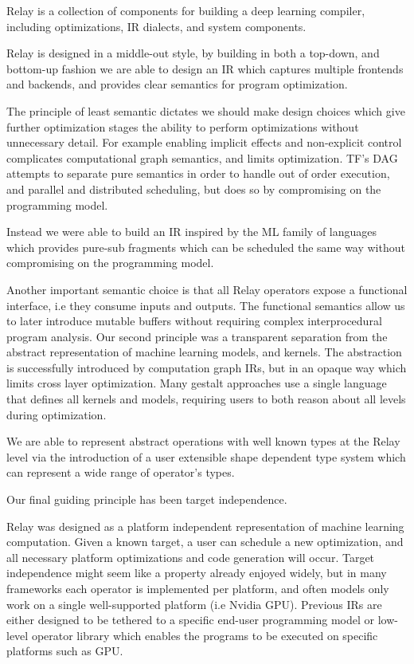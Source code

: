 Relay is a collection of components for building a deep learning compiler,
  including optimizations, IR dialects, and system components.

Relay is designed in a middle-out style,
  by building in both a top-down,
  and bottom-up fashion we are able to design an IR which captures multiple frontends and backends,
  and provides clear semantics for program optimization.

The principle of least semantic dictates we should make design choices which give further optimization stages
  the ability to perform optimizations without unnecessary detail.
For example enabling implicit effects and non-explicit control complicates computational graph semantics,
  and limits optimization.
TF’s DAG attempts to separate pure semantics in order to handle out of order execution, and parallel and distributed scheduling,
  but does so by compromising on the programming model.

Instead we were able to build an IR inspired by the ML family of languages which provides pure-sub fragments which can be scheduled
  the same way without compromising on the programming model.

Another important semantic choice is that all Relay operators expose a functional interface, i.e they consume inputs and outputs.
The functional semantics allow us to later introduce mutable buffers without requiring complex interprocedural program analysis.
Our second principle was a transparent separation from the abstract representation of machine learning models, and kernels.
The abstraction is successfully introduced by computation graph IRs, but in an opaque way which limits cross layer optimization.
Many gestalt approaches use a single language that defines all kernels and models, requiring users to both reason about all levels during optimization.

We are able to represent abstract operations with well known types at the Relay level via the introduction of a user extensible shape dependent
  type system which can represent a wide range of operator’s types.

Our final guiding principle has been target independence.

Relay was designed as a platform independent representation of machine learning computation.
Given a known target, a user can schedule a new optimization,
  and all necessary platform optimizations and code generation will occur.
Target independence might seem like a property already enjoyed widely,
  but in many frameworks each operator is implemented per platform,
  and often models only work on a single well-supported platform (i.e Nvidia GPU).
Previous IRs are either designed to be tethered to a specific end-user programming model
    or low-level operator library which enables the programs to be executed on specific platforms such as GPU.

